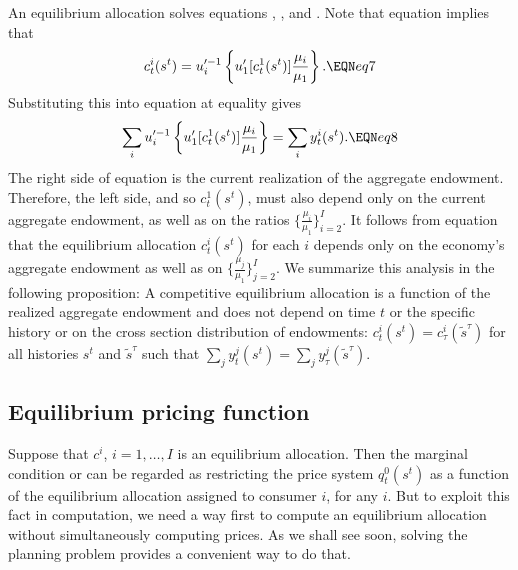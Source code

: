 An equilibrium allocation solves equations  ,  ,
and . Note that equation  implies that
$$ c_t^i(s^t) = u^{\prime -1}_i  \left\{u'_1[c_t^1(s^t)] {\mu_i \over \mu_1}
 \right\}. \EQN eq7 $$
Substituting this into equation  at equality gives
$$ \sum_i
u^{\prime -1}_i  \left\{u'_1[c_t^1(s^t)] {\mu_i \over \mu_1}\right\} =
       \sum_i y_t^i(s^t) .  \EQN eq8 $$
The right side of equation  is the current realization of
the aggregate endowment. %
Therefore, the left
side, and  so $c_t^1(s^t)$,  must also depend only on the current
aggregate endowment, as well as on the ratios
$\{ {\frac{\mu_i}{\mu_1}} \}_{i=2}^I$.  It follows from equation  that the
equilibrium allocation $c_t^i(s^t)$ for each $i$ depends only on
the economy's aggregate endowment as well as on
$\{ {\frac{\mu_j}{\mu_1}} \}_{j=2}^I$. We summarize this analysis  in
the following proposition:
\medskip
{}  A competitive equilibrium allocation
is a function of the realized aggregate endowment and does not depend
on time $t$ or the specific history or on
the cross section distribution of endowments:
$c_t^i(s^t)=c_\tau^i(\tilde s^{\tau})$ for all histories $s^t$ and $\tilde
s^{\tau}$ such that $\sum_j y_t^j(s^t) = \sum_j y_\tau^j(\tilde
s^{\tau})$.


\medskip








\subsection{Equilibrium pricing function}
  Suppose that $c^i$, $i=1, \ldots, I$  is an equilibrium allocation.
Then the   marginal condition  or  can be regarded as restricting
the price system $q_t^0(s^t)$ as a function of the equilibrium allocation assigned
to consumer $i$, for any $i$. But to exploit this fact in computation, we need a way first to compute
an equilibrium allocation without simultaneously  computing prices.  As we shall see soon, solving the planning problem provides a convenient way
to do that.


